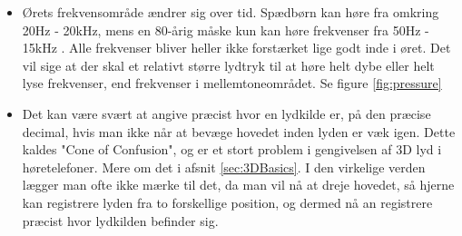 \begin{itemize}
	\item Ørets frekvensområde ændrer sig over tid. Spædbørn kan høre fra omkring 20Hz - 20kHz, mens en 80-årig måske kun kan høre frekvenser fra 50Hz - 15kHz . Alle frekvenser bliver heller ikke forstærket lige godt inde i øret. Det vil sige at der skal et relativt større lydtryk til at høre helt dybe eller helt lyse frekvenser, end frekvenser i mellemtoneområdet. Se figure \ref{fig:pressure}
	
	
	\item Det kan være svært at angive præcist hvor en lydkilde er, på den præcise decimal, hvis man ikke når at bevæge hovedet inden lyden er væk igen. Dette kaldes "Cone of Confusion", og er et stort problem i gengivelsen af 3D lyd i høretelefoner. Mere om det i afsnit \ref{sec:3DBasics}. I den virkelige verden lægger man ofte ikke mærke til det, da man vil nå at dreje hovedet, så hjerne kan registrere lyden fra to forskellige position, og dermed nå an registrere præcist hvor lydkilden befinder sig.
\end{itemize}